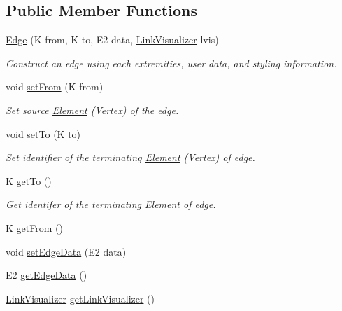 \subsection*{Public Member Functions}
\begin{DoxyCompactItemize}
\item 
\hyperlink{classbridges_1_1base_1_1_edge_a2a17f458612fbcee8e9efb8d91a6cc18}{Edge} (K from, K to, E2 data, \hyperlink{classbridges_1_1base_1_1_link_visualizer}{Link\+Visualizer} lvis)
\begin{DoxyCompactList}\small\item\em Construct an edge using each extremities, user data, and styling information. \end{DoxyCompactList}\item 
void \hyperlink{classbridges_1_1base_1_1_edge_aef1a55d996fc36217629b884435b9f35}{set\+From} (K from)
\begin{DoxyCompactList}\small\item\em Set source \hyperlink{classbridges_1_1base_1_1_element}{Element} (Vertex) of the edge. \end{DoxyCompactList}\item 
void \hyperlink{classbridges_1_1base_1_1_edge_a5e574139711be3f96c42da02a2702aea}{set\+To} (K to)
\begin{DoxyCompactList}\small\item\em Set identifier of the terminating \hyperlink{classbridges_1_1base_1_1_element}{Element} (Vertex) of edge. \end{DoxyCompactList}\item 
K \hyperlink{classbridges_1_1base_1_1_edge_ab451c13aa8173b5ef1cc2b2dd4f8508f}{get\+To} ()
\begin{DoxyCompactList}\small\item\em Get identifer of the terminating \hyperlink{classbridges_1_1base_1_1_element}{Element} of edge. \end{DoxyCompactList}\item 
K \hyperlink{classbridges_1_1base_1_1_edge_afc23a7c2ee8ab4c4f0950c9bf25edd56}{get\+From} ()
\item 
void \hyperlink{classbridges_1_1base_1_1_edge_a733d7f5eb4950d1fc4e14b7096faeb5c}{set\+Edge\+Data} (E2 data)
\item 
E2 \hyperlink{classbridges_1_1base_1_1_edge_a19a623d647eb17b7e53f1360577b0703}{get\+Edge\+Data} ()
\item 
\hyperlink{classbridges_1_1base_1_1_link_visualizer}{Link\+Visualizer} \hyperlink{classbridges_1_1base_1_1_edge_a11c655622b8a54f2931f59b1d256f84a}{get\+Link\+Visualizer} ()

\end{DoxyCompactItemize}
